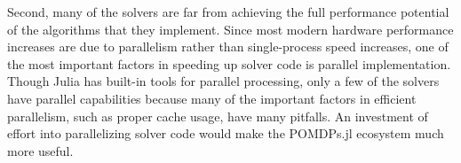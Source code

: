 Second, many of the solvers are far from achieving the full performance potential of the algorithms that they implement.
Since most modern hardware performance increases are due to parallelism rather than single-process speed increases, one of the most important factors in speeding up solver code is parallel implementation.
Though Julia has built-in tools for parallel processing, only a few of the solvers have parallel capabilities because many of the important factors in efficient parallelism, such as proper cache usage, have many pitfalls.
An investment of effort into parallelizing solver code would make the POMDPs.jl ecosystem much more useful.
